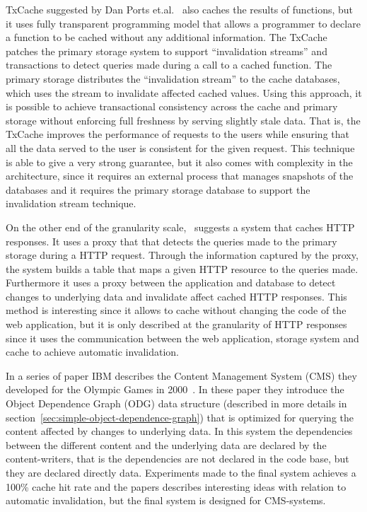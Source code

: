 TxCache suggested by Dan Ports et.al.~\cite{paper:liskov} also caches the results of functions, but it uses fully transparent programming model that allows a programmer to declare a function to be cached without any additional information. The TxCache patches the primary storage system to support ``invalidation streams'' and transactions to detect queries made during a call to a cached function. The primary storage distributes the ``invalidation stream'' to the cache databases, which uses the stream to invalidate affected cached values. Using this approach, it is possible to achieve transactional consistency across the cache and primary storage without enforcing full freshness by serving slightly stale data. That is, the TxCache improves the performance of requests to the users while ensuring that all the data served to the user is consistent for the given request. This technique is able to give a very strong guarantee, but it also comes with complexity in the architecture, since it requires an external process that manages snapshots of the databases and it requires the primary storage database to support the invalidation stream technique.

On the other end of the granularity scale,~\cite{paper:db-driven-http} suggests a system that caches HTTP responses. It uses a proxy that that detects the queries made to the primary storage during a HTTP request. Through the information captured by the proxy, the system builds a table that maps a given HTTP resource to the queries made. Furthermore it uses a proxy between the application and database to detect changes to underlying data and invalidate affect cached HTTP responses. This method is interesting since it allows to cache without changing the code of the web application, but it is only described at the granularity of HTTP responses since it uses the communication between the web application, storage system and cache to achieve automatic invalidation.

In a series of paper IBM describes the Content Management System (CMS) they developed for the Olympic Games in 2000~\cite{paper:ibm, paper:ibm-extended, paper:ibm-publishing-system}. In these paper they introduce the Object Dependence Graph (ODG) data structure (described in more details in section~\ref{sec:simple-object-dependence-graph}) that is optimized for querying the content affected by changes to underlying data. In this system the dependencies between the different content and the underlying data are declared by the content-writers, that is the dependencies are not declared in the code base, but they are declared directly data. Experiments made to the final system achieves a 100\% cache hit rate and the papers describes interesting ideas with relation to automatic invalidation, but the final system is designed for CMS-systems.

